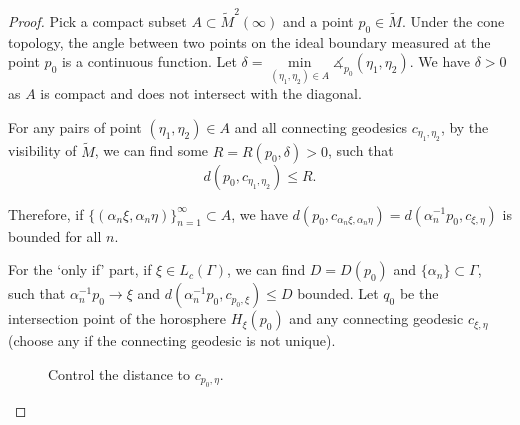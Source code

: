 \documentclass[reqno,11pt]{article}
\theoremstyle{definition}
\theoremstyle{remark}
\numberwithin{equation}{section}
\begin{document}
\begin{proof}
	Pick a compact subset $A\subset\widetilde{M}^2(\infty)$ and a point $p_0\in\widetilde{M}$. Under the cone topology, the angle between two points on the ideal boundary measured at the point $p_0$ is a continuous function. Let $\delta=\min\limits_{(\eta_1,\eta_2)\in A}\measuredangle_{p_0}(\eta_1,\eta_2)$. We have $\delta>0$ as $A$ is compact and does not intersect with the diagonal.

	For any pairs of point $(\eta_1,\eta_2)\in A$ and all connecting geodesics $c_{\eta_1,\eta_2}$, by the visibility of $\widetilde{M}$, we can find some $R=R(p_0,\delta)>0$, such that
	\begin{displaymath}
		d(p_0,c_{\eta_1,\eta_2})\leq R.
	\end{displaymath}

	Therefore, if ${\{(\alpha_n\xi, \alpha_n\eta)\}}_{n=1}^\infty\subset A$, we have $d(p_0,c_{\alpha_n\xi,\alpha_n\eta})=d(\alpha_n^{-1}p_0, c_{\xi,\eta})$ is bounded for all $n$.

	For the `only if' part, if $\xi\in L_{c}(\Gamma)$, we can find $D=D(p_0)$ and $\{\alpha_n\}\subset\Gamma$, such that $\alpha_n^{-1}p_0\to\xi$ and $d(\alpha_n^{-1}p_0, c_{p_0,\xi})\leq D$ bounded. Let $q_0$ be the intersection point of the horosphere $H_{\xi}(p_0)$ and any connecting geodesic $c_{\xi,\eta}$ (choose any if the connecting geodesic is not unique).
	\begin{figure}[htbp]
		\centering
        \caption{Control the distance to $c_{p_0,\eta}$.}\label{fig4}
	\end{figure}


\end{proof}
\end{document}
